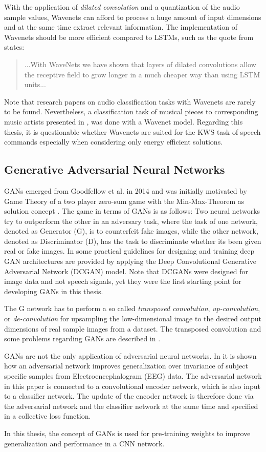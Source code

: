 With the application of \emph{dilated convolution} and a quantization of the audio sample values, Wavenets can afford to process a huge amount of input dimensions and at the same time extract relevant information.
The implementation of Wavenets should be more efficient compared to LSTMs, such as the quote from \cite{Oord2016} states:
\begin{quote}
  ...With WaveNets we have shown that layers of dilated convolutions allow the receptive field to grow longer in a much cheaper way than using LSTM units...
\end{quote}
Note that research papers on audio classification tasks with Wavenets are rarely to be found.
Nevertheless, a classification task of musical pieces to corresponding music artists presented in \cite{Zhang2020}, was done with a Wavenet model.
Regarding this thesis, it is questionable whether Wavenets are suited for the KWS task of speech commands especially when considering only energy efficient solutions.



\subsection{Generative Adversarial Neural Networks}\label{sec:prev_nn_adv}
GANs emerged from Goodfellow et al. in 2014 \cite{Goodfellow2014} and was initially motivated by Game Theory of a two player zero-sum game with the Min-Max-Theorem as solution concept \cite{VonNeumann1944}.
The game in terms of GANs is as follows: Two neural networks try to outperform the other in an adversary task, where the task of one network, denoted as Generator (G), is to counterfeit fake images, while the other network, denoted as Discriminator (D), has the task to discriminate whether its been given real or fake images.
In \cite{Radford2016} some practical guidelines for designing and training deep GAN architectures are provided by applying the Deep Convolutional Generative Adversarial Network (DCGAN) model.
Note that DCGANs were designed for image data and not speech signals, yet they were the first starting point for developing GANs in this thesis.

The G network has to perform a so called \emph{transposed convolution}, \emph{up-convolution}, or \emph{de-convolution} for upsampling the low-dimensional image to the desired output dimensions of real sample images from a dataset.
The transposed convolution and some problems regarding GANs are described in \cite{Durall2020}.

GANs are not the only application of adversarial neural networks. 
In \cite{Oezdenizci2020} it is shown how an adversarial network improves generalization over invariance of subject specific samples from Electroencephalogram (EEG) data.
The adversarial network in this paper is connected to a convolutional encoder network, which is also input to a classifier network.
The update of the encoder network is therefore done via the adversarial network and the classifier network at the same time and specified in a collective loss function.

In this thesis, the concept of GANs is used for pre-training weights to improve generalization and performance in a CNN network.